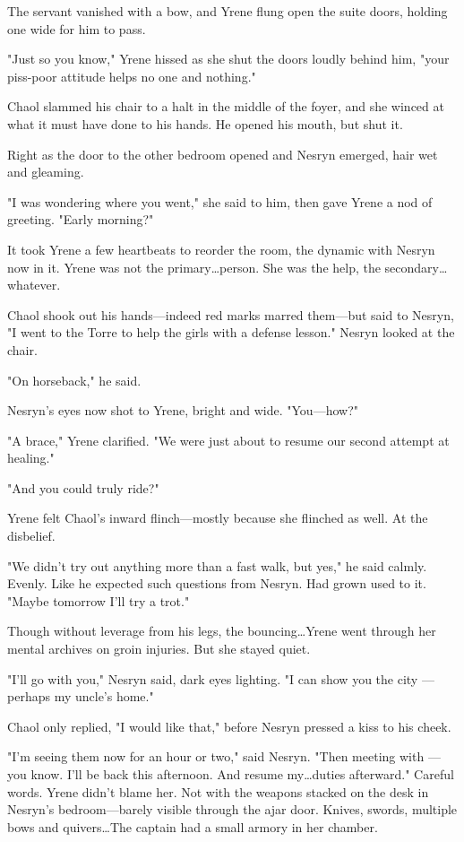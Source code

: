 The servant vanished with a bow, and Yrene flung open the suite doors, holding one wide for him to pass.

"Just so you know," Yrene hissed as she shut the doors loudly behind him, "your piss-poor attitude helps no one and nothing."

Chaol slammed his chair to a halt in the middle of the foyer, and she winced at what it must have done to his hands.
He opened his mouth, but shut it.

Right as the door to the other bedroom opened and Nesryn emerged, hair wet and gleaming.

"I was wondering where you went," she said to him, then gave Yrene a nod of greeting.
"Early morning?"

It took Yrene a few heartbeats to reorder the room, the dynamic with Nesryn now in it.
Yrene was not the primary\ldots person.
She was the help, the secondary\ldots whatever.

Chaol shook out his hands---indeed red marks marred them---but said to Nesryn, "I went to the Torre to help the girls with a defense lesson."
Nesryn looked at the chair.

"On horseback," he said.

Nesryn's eyes now shot to Yrene, bright and wide.
"You---how?"

"A brace," Yrene clarified.
"We were just about to resume our second attempt at healing."

"And you could truly ride?"

Yrene felt Chaol's inward flinch---mostly because she flinched as well.
At the disbelief.

"We didn't try out anything more than a fast walk, but yes," he said calmly.
Evenly.
Like he expected such questions from Nesryn.
Had grown used to it.
"Maybe tomorrow I'll try a trot."

Though without leverage from his legs, the bouncing\ldots Yrene went through her mental archives on groin injuries.
But she stayed quiet.

"I'll go with you," Nesryn said, dark eyes lighting.
"I can show you the city ---perhaps my uncle's home."

Chaol only replied, "I would like that," before Nesryn pressed a kiss to his cheek.

"I'm seeing them now for an hour or two," said Nesryn.
"Then meeting with ---you know.
I'll be back this afternoon.
And resume my\ldots duties afterward."
Careful words.
Yrene didn't blame her.
Not with the weapons stacked on the desk in Nesryn's bedroom---barely visible through the ajar door.
Knives, swords, multiple bows and quivers\ldots The captain had a small armory in her chamber.

